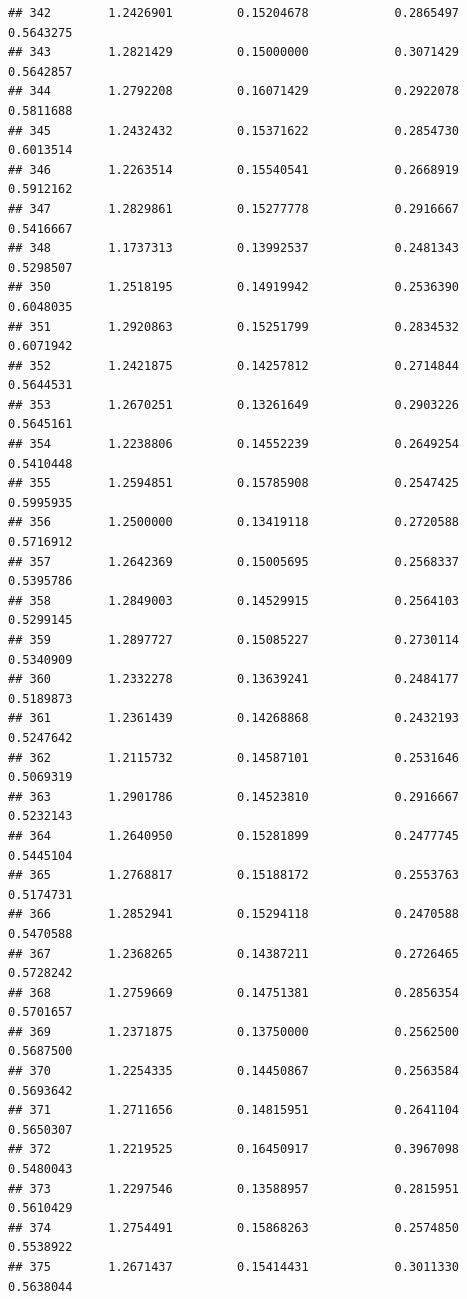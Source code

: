 \documentclass[]{article}
\begin{document}
\begin{verbatim}
## 342        1.2426901         0.15204678            0.2865497        0.5643275
## 343        1.2821429         0.15000000            0.3071429        0.5642857
## 344        1.2792208         0.16071429            0.2922078        0.5811688
## 345        1.2432432         0.15371622            0.2854730        0.6013514
## 346        1.2263514         0.15540541            0.2668919        0.5912162
## 347        1.2829861         0.15277778            0.2916667        0.5416667
## 348        1.1737313         0.13992537            0.2481343        0.5298507
## 350        1.2518195         0.14919942            0.2536390        0.6048035
## 351        1.2920863         0.15251799            0.2834532        0.6071942
## 352        1.2421875         0.14257812            0.2714844        0.5644531
## 353        1.2670251         0.13261649            0.2903226        0.5645161
## 354        1.2238806         0.14552239            0.2649254        0.5410448
## 355        1.2594851         0.15785908            0.2547425        0.5995935
## 356        1.2500000         0.13419118            0.2720588        0.5716912
## 357        1.2642369         0.15005695            0.2568337        0.5395786
## 358        1.2849003         0.14529915            0.2564103        0.5299145
## 359        1.2897727         0.15085227            0.2730114        0.5340909
## 360        1.2332278         0.13639241            0.2484177        0.5189873
## 361        1.2361439         0.14268868            0.2432193        0.5247642
## 362        1.2115732         0.14587101            0.2531646        0.5069319
## 363        1.2901786         0.14523810            0.2916667        0.5232143
## 364        1.2640950         0.15281899            0.2477745        0.5445104
## 365        1.2768817         0.15188172            0.2553763        0.5174731
## 366        1.2852941         0.15294118            0.2470588        0.5470588
## 367        1.2368265         0.14387211            0.2726465        0.5728242
## 368        1.2759669         0.14751381            0.2856354        0.5701657
## 369        1.2371875         0.13750000            0.2562500        0.5687500
## 370        1.2254335         0.14450867            0.2563584        0.5693642
## 371        1.2711656         0.14815951            0.2641104        0.5650307
## 372        1.2219525         0.16450917            0.3967098        0.5480043
## 373        1.2297546         0.13588957            0.2815951        0.5610429
## 374        1.2754491         0.15868263            0.2574850        0.5538922
## 375        1.2671437         0.15414431            0.3011330        0.5638044

\end{verbatim}
\end{document}
